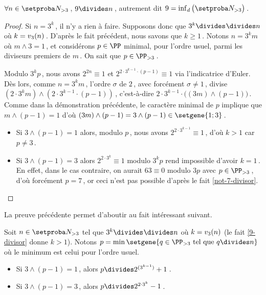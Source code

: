 

\begin{fact} \label{9-divisor}
	$\forall n \in \ourset_{>3}$\,, $9 \divides n$\,, autrement dit $9 = \dinf \big( \ourset_{>3} \big)$\,.
\end{fact}

\begin{proof}
	Si $n = 3^k$\,, il n'y a rien à faire. Supposons donc que $3^k \strictdivides n$ où $k = \padicval[3]{n}$\,. 
	D'après le fait précédent, nous savons que $k \geq 1$\,. Notons $n = 3^k m$ où $m \wedge 3 = 1$\,, et considérons $p\in\PP$ minimal, pour l'ordre usuel, parmi les diviseurs premiers de $m$\,. On sait que $p \in \PP_{>3}$\,.
	
	\medskip

	Modulo $3^k p$\,, nous avons
	$2^{2n} \equiv 1$
	et
	$2^{2 \cdot 3^{k-1} \cdot (p-1)} \equiv 1$
	via l'indicatrice d'Euler.
	Dès lors, comme $n = 3^k m$\,, l'ordre $\sigma$ de $2$\,, avec forcément $\sigma \neq 1$\,, divise 
	$(2 \cdot 3^k m) \wedge (2 \cdot 3^{k-1} \cdot (p-1))$\,,
	c'est-à-dire
	$2 \cdot 3^{k-1} \cdot \big( (3 m) \wedge (p-1) \big)$\,.
	Comme dans la démonstration précédente, le caractère minimal de $p$ implique que 
	$m \wedge (p-1) = 1$
	d'où
	$(3 m) \wedge (p-1) = 3 \wedge (p-1) \in \setgene{1 ; 3}$\,.
	\begin{itemize}
		\item Si $3 \wedge (p-1) = 1$ alors, modulo $p$\,,
		nous avons $2^{2 \cdot 3^{k-1}} \equiv 1$\,, d'où $k > 1$ car $p \neq 3$\,.

		\item Si $3 \wedge (p-1) = 3$ alors $2^{2 \cdot 3^k} \equiv 1$ modulo $3^k p$ rend impossible d'avoir $k = 1$\,.
		En effet, dans le cas contraire, on aurait $63 \equiv 0$ modulo $3 p$ avec $p \in \PP_{>3}$\,, d'où forcément $p = 7$\,,
		or ceci n'est pas possible d'après le fait \ref{not-7-divisor}.
	\end{itemize}
\end{proof}




La preuve précédente permet d'aboutir au fait intéressant suivant.


\begin{fact}
	Soit 
	$n \in \ourset_{>3}$ tel que $3^k \strictdivides n$ où $k = \padicval[3]{n}$ (le fait \ref{9-divisor} donne $k > 1$).
	Notons $p = \min \setgene{q \in \PP_{>3} \text{ tel que } q \divides n}$ où le minimum est celui pour l'ordre usuel.
	\begin{itemize}
		\item Si $3 \wedge (p-1) = 1$\,, alors $p \divides 2^{(3^{k-1})} + 1$\,.

		\item Si $3 \wedge (p-1) = 3$\,, alors $p \divides 2^{2 \cdot 3^k} - 1$\,.
	\end{itemize}
\end{fact}


